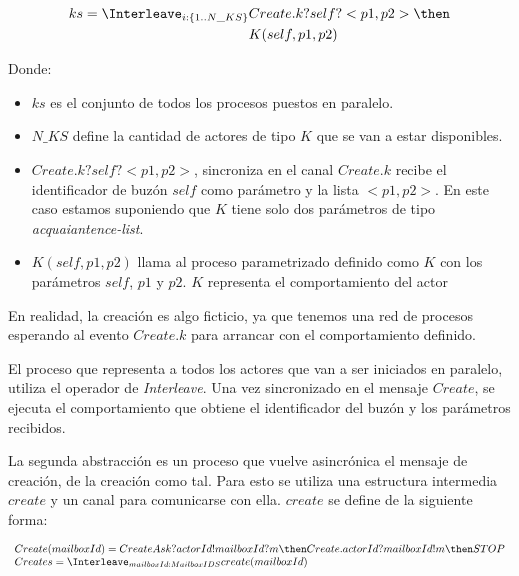 \begin{align*}
ks = \Interleave_{i: \{1 .. N\_KS\}} & Create.k?self?<p1, p2> \then \\
& K(self, p1, p2) 
\end{align*}

Donde:

\begin{itemize}
 \item $ks$ es el conjunto de todos los procesos puestos en paralelo.
 \item $N\_KS$ define la cantidad de actores de tipo $K$ que se van a estar disponibles.
 \item $Create.k?self?<p1, p2>$, sincroniza en el canal $Create.k$ recibe el identificador de buzón $self$ como parámetro y la lista  $<p1, p2>$. En este caso estamos suponiendo que $K$ tiene solo dos parámetros de tipo \textit{acquaiantence-list}.
 \item $K(self, p1, p2)$ llama al proceso parametrizado definido como $K$ con los parámetros $self$, $p1$ y $p2$. $K$ representa el comportamiento del actor
\end{itemize}

En realidad, la creación es algo ficticio, ya que tenemos una red de procesos \CSP esperando al evento $Create.k$ para arrancar con el comportamiento definido. 


El proceso que representa a todos los actores que van a ser iniciados en paralelo, utiliza el operador de \textit{Interleave}. Una vez sincronizado en el mensaje $Create$, se ejecuta el comportamiento que obtiene el identificador del buzón y los parámetros recibidos. 

La segunda abstracción es un proceso que vuelve asincrónica el mensaje de creación, de la creación como tal. Para esto se utiliza una estructura intermedia $create$ y un canal para comunicarse con ella. $create$ se define de la siguiente forma: 

\[
\begin{array}{l}
Create(mailboxId) = CreateAsk?actorId!mailboxId?m \then Create.actorId?mailboxId!m \then STOP \\
Creates = \Interleave_{mailboxId : MailboxIDS} create(mailboxId)
\end{array}
\]

